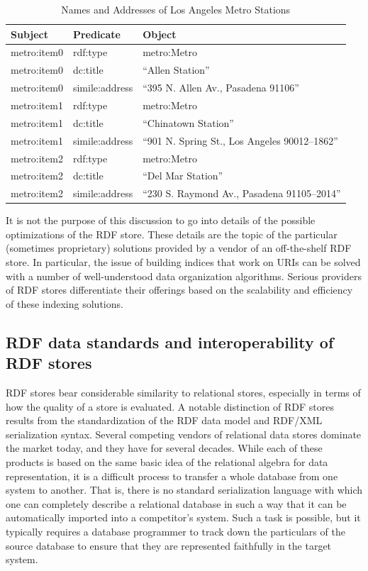 \begin{table}[h]
\centering
\begin{tabular}{||l l l ||} 
 \hline
 Subject&Predicate&Object \\ [0.5ex] 
 \hline\hline
metro:item0&rdf:type&metro:Metro \\
metro:item0&dc:title&``Allen Station'' \\
metro:item0&simile:address&``395 N. Allen Av., Pasadena 91106'' \\
metro:item1&rdf:type&metro:Metro \\
metro:item1&dc:title&``Chinatown Station'' \\
metro:item1&simile:address&``901 N. Spring St., Los Angeles 90012--1862'' \\
metro:item2&rdf:type&metro:Metro \\
metro:item2&dc:title&``Del Mar Station'' \\
metro:item2&simile:address&``230 S. Raymond Av., Pasadena 91105--2014'' \\
\hline
\end{tabular}
\caption{Names and Addresses of Los Angeles Metro Stations}
\label{tab:ch4.14}
\end{table}



It is not the purpose of this discussion to go into details of the
possible optimizations of the RDF store. These details are the topic of
the particular (sometimes proprietary) solutions provided by a vendor of
an off-the-shelf RDF store. In particular, the issue of building indices
that work on URIs can be solved with a number of well-understood data
organization algorithms. Serious providers of RDF stores differentiate
their offerings based on the scalability and efficiency of these
indexing solutions.

\subsection{RDF data standards and interoperability of RDF stores}

RDF stores bear considerable similarity to relational stores, especially
in terms of how the quality of a store is evaluated. A notable
distinction of RDF stores results from the standardization of the RDF
data model and RDF/XML serialization syntax. Several competing vendors
of relational data stores dominate the market today, and they have for
several decades. While each of these products is based on the same basic
idea of the relational algebra for data representation, it is a
difficult process to transfer a whole database from one system to
another. That is, there is no standard serialization language with which
one can completely describe a relational database in such a way that it
can be automatically imported into a competitor's system. Such a task is
possible, but it typically requires a database programmer to track down
the particulars of the source database to ensure that they are
represented faithfully in the target system.

